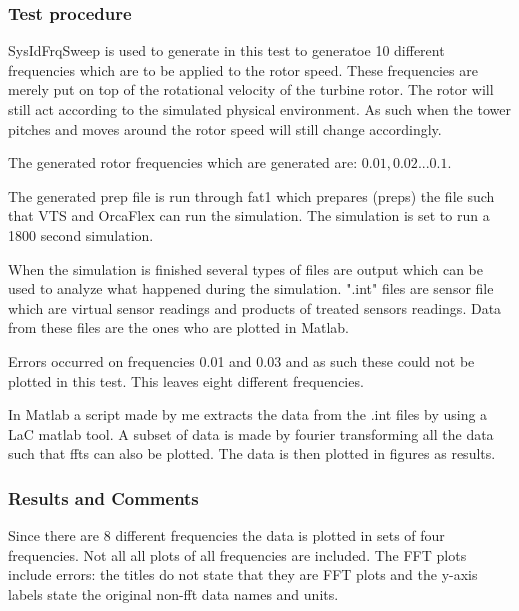\subsubsection*{Test procedure}
SysIdFrqSweep is used to generate in this test to generatoe 10 different frequencies which are to be applied to the rotor speed. These frequencies are merely put on top of the rotational velocity of the turbine rotor. The rotor will still act according to the simulated physical environment. As such when the tower pitches and moves around the rotor speed will still change accordingly.

The generated rotor frequencies which are generated  are: $0.01, 0.02 ... 0.1$.

The generated prep file is run through fat1 which prepares (preps) the file such that VTS and OrcaFlex can run the simulation. The simulation is set to run a 1800 second simulation.

When the simulation is finished several types of files are output which can be used to analyze what happened during the simulation. ".int" files are sensor file which are virtual sensor readings and products of treated sensors readings. Data from these files are the ones who are plotted in Matlab.

Errors occurred on frequencies 0.01 and 0.03 and as such these could not be plotted in this test. This leaves eight different frequencies.

In Matlab a script made by me extracts the data from the .int files by using a LaC matlab tool. A subset of data is made by fourier transforming all the data such that ffts can also be plotted. The data is then plotted in figures as results.


\subsubsection*{Results and Comments}
Since there are 8 different frequencies the data is plotted in sets of four frequencies. Not all all plots of all frequencies are included. The FFT plots include errors: the titles do not state that they are FFT plots and the y-axis labels state the original non-fft data names and units.

